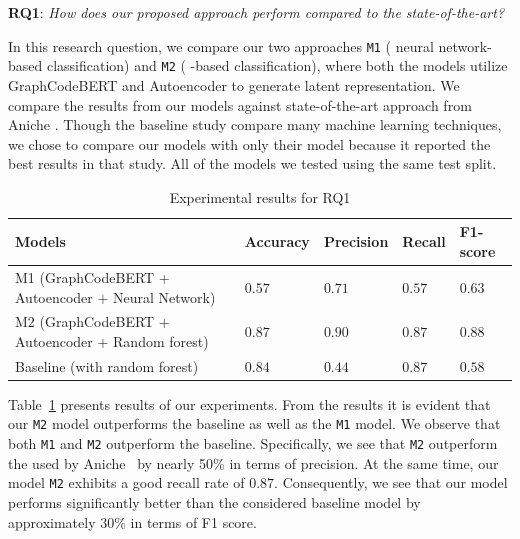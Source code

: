 \noindent
\textbf{RQ1}: \textit{How does our proposed approach perform compared to
the state-of-the-art?}




In this research question, we compare our two approaches \texttt{M1} (\ie{} neural network-based classification) and \texttt{M2} (\ie{} \rf{}-based classification), where both the models utilize GraphCodeBERT and Autoencoder to generate latent representation.
We compare the results from our models
against state-of-the-art approach from Aniche \etal{} \cite{Aniche2020Effectiveness}.
Though the baseline study compare many machine learning techniques,
we chose to compare our models with only their \rf{} model because it reported the best results in that study.
All of the models we tested using the same test split.

\begin{table}[ht]
\centering
\caption{Experimental results for RQ1}
\label{tab:exresults}
\begin{tabular}{p{4cm}|%
>{\raggedleft\arraybackslash}p{2cm}%
>{\raggedleft\arraybackslash}p{2cm}%
>{\raggedleft\arraybackslash}p{2cm}%
>{\raggedleft\arraybackslash}p{2cm}%
}
\textbf{Models} & \textbf{Accuracy} & \textbf{Precision} & \textbf{Recall} & \textbf{F1-score} \\ \midrule
M1 (GraphCodeBERT + Autoencoder + Neural Network) & $0.57$ & $0.71$ & $0.57$ & $0.63$ \\
M2 (GraphCodeBERT + Autoencoder + Random forest) & $\mathbf{0.87}$ & $\mathbf{0.90}$ & $\mathbf{0.87}$ & $\mathbf{0.88}$  \\
Baseline (with random forest) & $0.84$ & $0.44$ & $\mathbf{0.87}$ & $0.58$ \\\bottomrule
\end{tabular}
\end{table}


Table~\ref{tab:exresults} presents results of our experiments.
From the results it is evident that our \texttt{M2} model outperforms the baseline as well as the \texttt{M1} model. 
We observe that both \texttt{M1} and \texttt{M2} outperform the baseline. Specifically, we see that \texttt{M2} outperform the \rf{} used by Aniche~\etal{} by nearly 50\% in terms of precision.
At the same time, our model \texttt{M2} exhibits a good recall rate of $0.87$.
Consequently, we see that our model 
performs significantly better than the considered baseline model by approximately $30\%$ in terms of F1 score.


